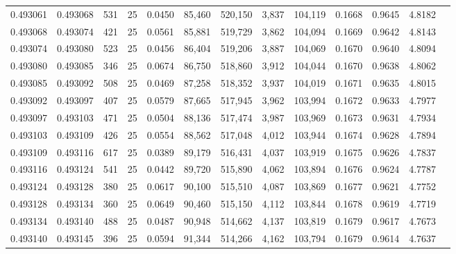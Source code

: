 \begin{tabular}{rrrrrrrrrrrrr}
0.493061 & 0.493068 &   531 &  25 &                                     0.0450 &  85,460 & 520,150 &   3,837 & 104,119 & 0.1668 & 0.9645 & 4.8182 \\
0.493068 & 0.493074 &   421 &  25 &                                     0.0561 &  85,881 & 519,729 &   3,862 & 104,094 & 0.1669 & 0.9642 & 4.8143 \\
0.493074 & 0.493080 &   523 &  25 &                                     0.0456 &  86,404 & 519,206 &   3,887 & 104,069 & 0.1670 & 0.9640 & 4.8094 \\
0.493080 & 0.493085 &   346 &  25 &                                     0.0674 &  86,750 & 518,860 &   3,912 & 104,044 & 0.1670 & 0.9638 & 4.8062 \\
0.493085 & 0.493092 &   508 &  25 &                                     0.0469 &  87,258 & 518,352 &   3,937 & 104,019 & 0.1671 & 0.9635 & 4.8015 \\
0.493092 & 0.493097 &   407 &  25 &                                     0.0579 &  87,665 & 517,945 &   3,962 & 103,994 & 0.1672 & 0.9633 & 4.7977 \\
0.493097 & 0.493103 &   471 &  25 &                                     0.0504 &  88,136 & 517,474 &   3,987 & 103,969 & 0.1673 & 0.9631 & 4.7934 \\
0.493103 & 0.493109 &   426 &  25 &                                     0.0554 &  88,562 & 517,048 &   4,012 & 103,944 & 0.1674 & 0.9628 & 4.7894 \\
0.493109 & 0.493116 &   617 &  25 &                                     0.0389 &  89,179 & 516,431 &   4,037 & 103,919 & 0.1675 & 0.9626 & 4.7837 \\
0.493116 & 0.493124 &   541 &  25 &                                     0.0442 &  89,720 & 515,890 &   4,062 & 103,894 & 0.1676 & 0.9624 & 4.7787 \\
0.493124 & 0.493128 &   380 &  25 &                                     0.0617 &  90,100 & 515,510 &   4,087 & 103,869 & 0.1677 & 0.9621 & 4.7752 \\
0.493128 & 0.493134 &   360 &  25 &                                     0.0649 &  90,460 & 515,150 &   4,112 & 103,844 & 0.1678 & 0.9619 & 4.7719 \\
0.493134 & 0.493140 &   488 &  25 &                                     0.0487 &  90,948 & 514,662 &   4,137 & 103,819 & 0.1679 & 0.9617 & 4.7673 \\
0.493140 & 0.493145 &   396 &  25 &                                     0.0594 &  91,344 & 514,266 &   4,162 & 103,794 & 0.1679 & 0.9614 & 4.7637 \\

\end{tabular}
